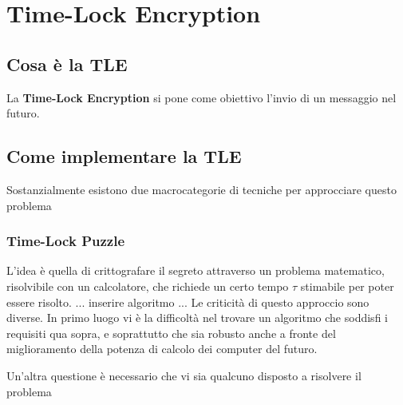 \chapter{Time-Lock Encryption}

\section{Cosa è la TLE}
La \textbf{Time-Lock Encryption} si pone come obiettivo l'invio di un messaggio
nel futuro.

\section{Come implementare la TLE}
Sostanzialmente esistono due macrocategorie di tecniche per approcciare questo problema

\subsection{Time-Lock Puzzle}
L'idea è quella di crittografare il segreto attraverso un problema matematico,
risolvibile con un calcolatore, che richiede un certo tempo $ \tau $ stimabile 
per poter essere risolto. 
... inserire algoritmo ...
Le criticità di questo approccio sono diverse. In primo luogo vi è la difficoltà nel
trovare un algoritmo che soddisfi i requisiti qua sopra, e soprattutto che sia robusto
anche a fronte del miglioramento della potenza di calcolo dei computer del futuro.

Un'altra questione è necessario che vi sia qualcuno disposto a risolvere il problema 
